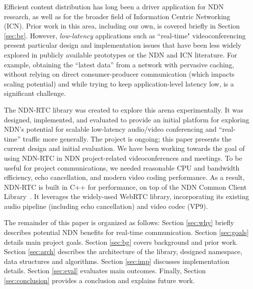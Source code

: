 \documentclass{icn/sig-alternate-2013} %
\newcommand{\ndnrtcName}{NDN-RTC} %
\newcommand{\ndnconName}{NdnCon}
\begin{document}
Efficient content distribution has long been a driver application for NDN research, as well as for the broader field of Information Centric Networking (ICN). Prior work in this area, including our own, is covered briefly in Section \ref{sec:bg}.  However, \emph{low-latency} applications such as ``real-time" videoconferencing present particular design and implementation issues that have been less widely explored in publicly available prototypes or the NDN and ICN literature.   For example, obtaining the ``latest data'' from a network with pervasive caching, without relying on direct consumer-producer communication (which impacts scaling potential) and while trying to keep application-level latency low, is a significant challenge.

The \ndnrtcName{} library was created to explore this arena experimentally. It was designed, implemented, and evaluated to provide an initial platform for exploring NDN's potential for scalable low-latency audio/video conferencing and ``real-time'' traffic more generally. The project is ongoing; this paper presents the current design and initial evaluation.  %
We have been working towards the goal of using \ndnrtcName{} in NDN project-related videoconferences and meetings.  To be useful for project communications, we needed reasonable CPU and bandwidth efficiency, echo cancellation, and  modern video coding performance. As a result, \ndnrtcName{} is built in C++ for performance, on top of the NDN Common Client Library~\cite{ccl-tr}. It leverages the widely-used WebRTC library, incorporating its existing audio pipeline (including echo cancellation) and video codec (VP9).

The remainder of this paper is organized as follows: Section \ref{sec:why} briefly describes potential NDN benefits for real-time communication. Section \ref{sec:goals} details main project goals. Section \ref{sec:bg} covers background and prior work. Section \ref{sec:arch} describes the architecture of the library, designed namespace, data structures and algorithms. Section \ref{sec:imp} discusses implementation details. Section \ref{sec:eval} evaluates main outcomes. Finally, Section \ref{sec:conclusion} provides a conclusion and explains future work.
\end{document}

